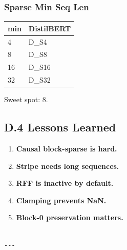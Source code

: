 \subsubsection{Sparse Min Seq Len}

\begin{table}[H]
\centering
\small
\begin{tabular}{ll}
\toprule
\textbf{min} & \textbf{DistilBERT} \\
\midrule
4 & {{D\_S4}} \\
8 & {{D\_S8}} \\
16 & {{D\_S16}} \\
32 & {{D\_S32}} \\
\bottomrule
\end{tabular}
\end{table}

Sweet spot: 8.

\subsection{D.4 Lessons Learned}

\begin{enumerate}
\item \textbf{Causal block-sparse is hard.}
\item \textbf{Stripe needs long sequences.}
\item \textbf{RFF is inactive by default.}
\item \textbf{Clamping prevents NaN.}
\item \textbf{Block-0 preservation matters.}
\end{enumerate}
\begin{lstlisting}

---
\end{lstlisting}